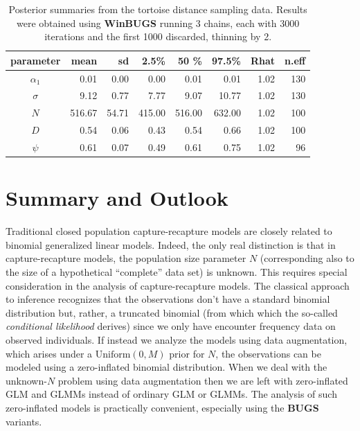 \begin{table}[ht]
  \caption{
    Posterior summaries from the tortoise distance sampling data. Results
    were obtained using {\bf WinBUGS}
    running
    3 chains, each with 3000 iterations and the first 1000 discarded,
    thinning by 2.
  }
\begin{tabular}{crrrrrrr} \hline \hline
 parameter &mean &   sd  & 2.5\%   &  50 \%  &   97.5\% &Rhat& n.eff
 \\ \hline
$\alpha_1$ &  0.01&  0.00 &   0.00 &  0.01   &   0.01 &1.02&   130   \\
$\sigma$  &   9.12&  0.77 &   7.77 &   9.07  &  10.77& 1.02&   130  \\
$N$       & 516.67& 54.71 & 415.00 & 516.00  & 632.00& 1.02&   100  \\
$D$       &   0.54&  0.06 &  0.43  & 0.54    &   0.66 &1.02&   100 \\
$\psi$    &   0.61&  0.07 &  0.49  & 0.61    &   0.75 &1.02&    96  \\ \hline
\end{tabular}
\label{closed.tab.dsamp}
\end{table}


\section{Summary and Outlook}

Traditional closed population capture-recapture models are closely
related to binomial generalized linear models.  Indeed, the only real
distinction is that in capture-recapture models, the population size
parameter $N$ (corresponding also to the size of a hypothetical
``complete'' data set) is unknown.  This requires special
consideration in the analysis of capture-recapture models. The
classical approach to inference recognizes that the observations don't
have a standard binomial distribution but, rather, a truncated
binomial (from which which the so-called {\it conditional likelihood}
derives) since we only have encounter frequency data on observed
individuals. If instead we analyze the models using data augmentation,
which arises under a $\mbox{Uniform}(0,M)$ prior for $N$, 
the observations can be modeled using a zero-inflated binomial
distribution. When we deal with the unknown-$N$ problem using
data augmentation then we are left with zero-inflated GLM and GLMMs
instead of ordinary GLM or GLMMs. The analysis of such zero-inflated
models is practically convenient, especially using the 
{\bf BUGS} variants.

